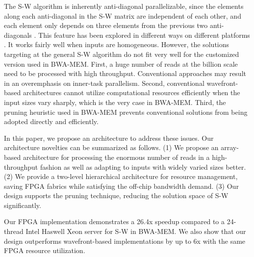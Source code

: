 The S-W algorithm is inherently anti-diagonal parallelizable, since the elements along each anti-diagonal in the S-W matrix are independent of each other, and each element only depends on three elements from the previous two anti-diagonals \cite{Edmiston1988}. 
This feature has been explored in different ways on different platforms \cite{Preusser2012}\cite{RaceLogic}\cite{Zhang2007}\cite{Kim2011}\cite{Lam2013}. 
It works fairly well when inputs are homogeneous. 
However, the solutions targeting at the general S-W algorithm do not fit very well for the customized version used in BWA-MEM. 
First, a huge number of reads at the billion scale need to be processed with high throughput. 
Conventional approaches may result in an overemphasis on inner-task parallelism. 
Second, conventional wavefront-based architectures cannot utilize computational resources efficiently when the input sizes vary sharply, which is the very case in BWA-MEM. 
Third, the pruning heuristic used in BWA-MEM prevents conventional solutions from being adopted directly and efficiently.

In this paper, we propose an architecture to address these issues.
Our architecture novelties can be summarized as follows. 
(1) We propose an array-based architecture for processing the enormous number of reads in a high-throughput fashion as well as adapting to inputs with widely varied sizes better. 
(2) We provide a two-level hierarchical architecture for resource management, saving FPGA fabrics while satisfying the off-chip bandwidth demand.
(3) Our design supports the pruning technique, reducing the solution space of S-W significantly. 

Our FPGA implementation demonstrates a 26.4x speedup compared to a 24-thread Intel Haswell Xeon server for S-W in BWA-MEM. 
We also show that our design outperforms wavefront-based implementations by up to 6x with the same FPGA resource utilization.
